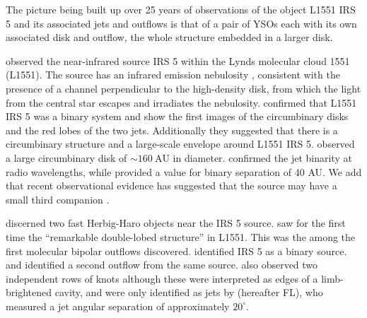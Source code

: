 \documentclass{aa}
\begin{document}
 The picture being built up over 25 years of observations 
of the object L1551 IRS 5 and its 
associated jets and outflows
is that of a pair of YSOs each with its own associated disk and outflow, 
the whole structure embedded in a larger disk.

\cite{1976AJ.....81..638S} observed the near-infrared source IRS 5 within the Lynds molecular cloud 1551 (L1551).
The source has an infrared emission 
nebulosity \citep{1994ApJS...94..615H}, consistent with the presence 
of a channel perpendicular to the high-density disk, from which the light
from the central star escapes and irradiates the nebulosity.
\citet{1998Natur.395..355R} confirmed that L1551 IRS 5 was a binary system and show the first images of the circumbinary disks and the red lobes of the two jets.
Additionally they suggested that there is a circumbinary structure and a large-scale envelope around L1551 IRS 5.
\citet{1994ApJ...434L..75L} observed a large circumbinary disk of $\sim 160~\mathrm{AU}$ in diameter.
\citet{2003ApJ...586L.137R} confirmed the jet binarity at radio
wavelengths, while
\citet{2005ApJ...L} provided a value for binary separation of 40 AU. 
We add that recent observational evidence has suggested that 
the source may have a small
third companion \citep{2006ApJ...653..425L}.
 



\cite{1979AJ.....84..548C} discerned two fast Herbig-Haro objects near the IRS 5 source.
\cite{1980ApJ...239L..17S} saw for the first time the ``remarkable double-lobed
structure'' in L1551.
This was the among the first molecular bipolar outflows discovered.
\citet{1985ApJ...289L...5B} identified IRS 5 as a binary source.
\citet{1991ApJ...373L..23M} and \citet{1991ApJ...383..705P} identified a second outflow from the same source.
\citet{1991A&A...252..740M} also observed two independent 
rows of knots although these were interpreted as edges of a 
limb-brightened cavity, and were only identified as jets by \citet{1998ApJ...499L..75F} (hereafter FL), who 
measured a jet angular separation of approximately $20^{\circ}$.
\end{document}
